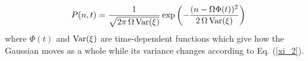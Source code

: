 \begin{equation}
  P(n,t) = \frac{1}{\sqrt{2\pi\,\Omega\,\textup{Var}(\xi)}}\exp\left(-\frac{(n-\Omega\Phi(t))^2}{2\,\Omega\,\textup{Var}(\xi)}\right)
\end{equation} 
where $\Phi(t)$ and $\textup{Var}(\xi)$ are time-dependent functions which give how the Gaussian moves as a whole while its variance changes according to Eq. (\ref{xi_2}).



